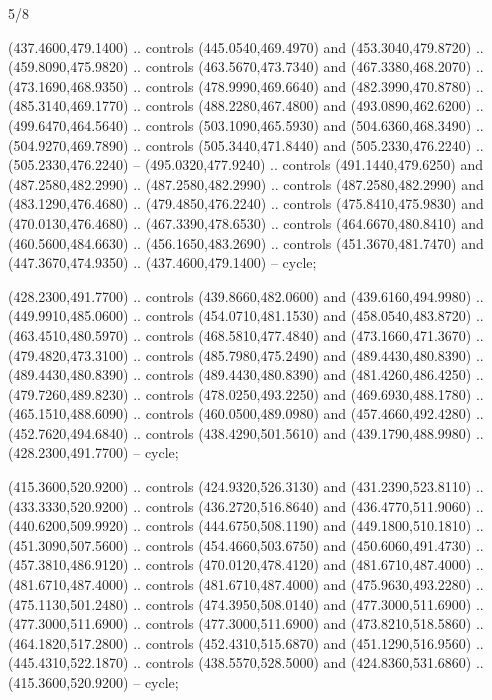 \begin{flagdescription}{5/8}
\begin{scope}[shift={(m)}]
\begin{scope}[scale=\flagwidth/220,y=0.1mm, x=0.1mm, yscale=-1,shift={(-596,-360)}]
\begin{scope}[draw=black,line join=round,line cap=round,line width=0.381\lw]
\begin{scope}[line width=0.534\lw,fill=green]
 (437.4600,479.1400) .. controls (445.0540,469.4970) and
  (453.3040,479.8720) .. (459.8090,475.9820) .. controls (463.5670,473.7340) and
  (467.3380,468.2070) .. (473.1690,468.9350) .. controls (478.9990,469.6640) and
  (482.3990,470.8780) .. (485.3140,469.1770) .. controls (488.2280,467.4800) and
  (493.0890,462.6200) .. (499.6470,464.5640) .. controls (503.1090,465.5930) and
  (504.6360,468.3490) .. (504.9270,469.7890) .. controls (505.3440,471.8440) and
  (505.2330,476.2240) .. (505.2330,476.2240) -- (495.0320,477.9240) .. controls
  (491.1440,479.6250) and (487.2580,482.2990) .. (487.2580,482.2990) .. controls
  (487.2580,482.2990) and (483.1290,476.4680) .. (479.4850,476.2240) .. controls
  (475.8410,475.9830) and (470.0130,476.4680) .. (467.3390,478.6530) .. controls
  (464.6670,480.8410) and (460.5600,484.6630) .. (456.1650,483.2690) .. controls
  (451.3670,481.7470) and (447.3670,474.9350) .. (437.4600,479.1400) -- cycle;

 (428.2300,491.7700) .. controls (439.8660,482.0600) and
  (439.6160,494.9980) .. (449.9910,485.0600) .. controls (454.0710,481.1530) and
  (458.0540,483.8720) .. (463.4510,480.5970) .. controls (468.5810,477.4840) and
  (473.1660,471.3670) .. (479.4820,473.3100) .. controls (485.7980,475.2490) and
  (489.4430,480.8390) .. (489.4430,480.8390) .. controls (489.4430,480.8390) and
  (481.4260,486.4250) .. (479.7260,489.8230) .. controls (478.0250,493.2250) and
  (469.6930,488.1780) .. (465.1510,488.6090) .. controls (460.0500,489.0980) and
  (457.4660,492.4280) .. (452.7620,494.6840) .. controls (438.4290,501.5610) and
  (439.1790,488.9980) .. (428.2300,491.7700) -- cycle;

 (415.3600,520.9200) .. controls (424.9320,526.3130) and
  (431.2390,523.8110) .. (433.3330,520.9200) .. controls (436.2720,516.8640) and
  (436.4770,511.9060) .. (440.6200,509.9920) .. controls (444.6750,508.1190) and
  (449.1800,510.1810) .. (451.3090,507.5600) .. controls (454.4660,503.6750) and
  (450.6060,491.4730) .. (457.3810,486.9120) .. controls (470.0120,478.4120) and
  (481.6710,487.4000) .. (481.6710,487.4000) .. controls (481.6710,487.4000) and
  (475.9630,493.2280) .. (475.1130,501.2480) .. controls (474.3950,508.0140) and
  (477.3000,511.6900) .. (477.3000,511.6900) .. controls (477.3000,511.6900) and
  (473.8210,518.5860) .. (464.1820,517.2800) .. controls (452.4310,515.6870) and
  (451.1290,516.9560) .. (445.4310,522.1870) .. controls (438.5570,528.5000) and
  (424.8360,531.6860) .. (415.3600,520.9200) -- cycle;


\end{scope}
\end{scope}
\end{scope}
\end{scope}
\end{flagdescription}
